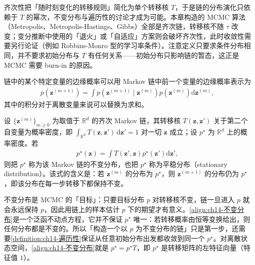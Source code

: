 \documentclass[../../main.tex]{subfiles}
\begin{document}
\begin{remark}齐次性把「随时刻变化的转移规则」简化为单个转移核 $T$，于是链的分布演化只依赖于 $T$ 的幂次，不变分布与遍历性的讨论才成为可能。本章构造的 MCMC 算法（Metropolis、Metropolis-Hastings、Gibbs）全部是齐次链，转移核不随 $\tau$ 改变；变分推断中使用的「退火」或「自适应」方案则会破坏齐次性，此时收敛性需要另行论证（例如 Robbins-Monro 型的学习率条件）。注意定义只要求条件分布相同，并不要求初始分布与 $T$ 有任何关系——初始分布只影响链的暂态，这正是 MCMC 需要 burn-in 的原因。
\end{remark}

链中的某个特定变量的边缘概率可以用 Markov 链中前一个变量的边缘概率表示为
\begin{align}
p\!\left(\bm{z}^{(m+1)}\right)=\int p\!\left(\bm{z}^{(m+1)}\mid\bm{z}^{(m)}\right)p\!\left(\bm{z}^{(m)}\right)\mathrm{d}\bm{z}^{(m)},
\label{align:ch14-链边缘}
\end{align}
其中的积分对于离散变量来说可以替换为求和。

\begin{definition}[不变分布]\label{definition:ch14-不变分布}
设 $\{\bm{z}^{(m)}\}_{m\geqslant0}$ 为取值于 $\mathbb{R}^{d}$ 的齐次 Markov 链，其转移核 $T(\bm{z},\bm{z}')$ 关于第二个自变量为概率密度，即 $\int_{\mathbb{R}^{d}}T(\bm{z},\bm{z}')\,\mathrm{d}\bm{z}'=1$ 对一切 $\bm{z}$ 成立；设 $p^{\star}$ 为 $\mathbb{R}^{d}$ 上的概率密度。若
\begin{align}
p^{\star}(\bm{z})=\int T\!\left(\bm{z}',\bm{z}\right)p^{\star}\!\left(\bm{z}'\right)\mathrm{d}\bm{z}',
\label{align:ch14-不变分布}
\end{align}
则把 $p^{\star}$ 称为该 Markov 链的不变分布，也把 $p^{\star}$ 称为平稳分布（stationary distribution）。该式的含义是：若 $\bm{z}^{(m)}$ 的分布为 $p^{\star}$，则 $\bm{z}^{(m+1)}$ 的分布仍为 $p^{\star}$，即该分布在每一步转移下都保持不变。
\end{definition}

\begin{remark}不变分布是 MCMC 的「目标」：只要目标分布 $p$ 对转移核不变，链一旦进入 $p$ 就会永远保持 $p$，因此用链上的样本估计 $p$ 下的期望才有意义。\eqref{align:ch14-不变分布}是一个泛函不动点方程，它并不保证 $p^{\star}$ 唯一：若转移概率由恒等变换给出，则任何分布都是不变的。所以「构造一个以 $p$ 为不变分布的链」只是第一步，还需要\cref{definition:ch14-遍历性}保证从任意初始分布出发都收敛到同一个 $p^{\star}$。对离散状态空间，\eqref{align:ch14-不变分布}就是 $p^{\star}=p^{\star}T$，即 $p^{\star}$ 是转移矩阵的左特征向量（特征值 $1$）。
\end{remark}
\end{document}
